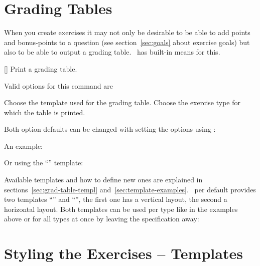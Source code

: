 \documentclass{xsim-manual}
\begin{document}
\section{Grading Tables}\label{sec:grading-tables}
When you create exercises it may not only be desirable to be able to add
points and bonus-points to a question (see section~\vref{sec:goals} about
exercise goals) but also to be able to output a grading table. \xsim\ has
built-in means for this.
\begin{commands}
  []
    Print a grading table.
\end{commands}
Valid options for this command are
\begin{options}
    Choose the template used for the grading table.
  \Default
    Choose the exercise type for which the table is printed.
\end{options}
Both option defaults can be changed with  setting the options
using :
\begin{sourcecode}
\end{sourcecode}

An example:
\begin{example}
  \gradingtable[type=exercise]
\end{example}

Or using the \enquote{} template:
\begin{example}
  \gradingtable[template=default*,type=exercise]
\end{example}

Available templates and how to define new ones are explained in
sections~\vref{sec:grad-table-templ} and~\vref{sec:template-examples}.  \xsim\
per default provides two templates \enquote{} and
\enquote{}, the first one has a vertical layout, the second a
horizontal layout.  Both templates can be used per type like in the examples
above or for all types at once by leaving the specification \option{type}
away:
\begin{example}
  \gradingtable
\end{example}

\section{Styling the Exercises -- Templates}\label{sec:styl-exerc-templ}
\end{document}
